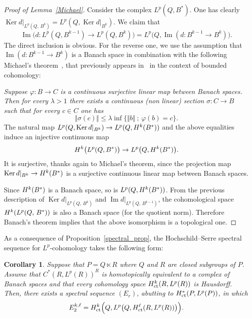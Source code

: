 \documentclass[11pt]{article}
\newtheorem{coro}[theo]{Corollary}
\theoremstyle{definition}
\numberwithin{equation}{section}
\numberwithin{figure}{section}
\numberwithin{table}{section}
\DeclareMathOperator{\Ker}{Ker}
\DeclareMathOperator{\im}{Im}
\DeclareMathOperator{\ct}{ct}
\begin{document}
\begin{proof}[Proof of Lemma~\ref{Michael}]
Consider the complex $L^p(Q,B^*)$.
One has clearly\linebreak $\Ker d \vert_{L^p (Q,\,B^k)} = L^p (Q, \Ker d \vert _{B^k})$. We claim that
\[
\im \bigl(d: L^p \left(Q, B^{k-1}\right) \to L^p\left(Q, B^k\right)\bigr) = L^p \bigl(Q, \im \left(d: B^{k-1} \to B^k\right)\bigr).
\]
The direct inclusion is obvious. For the reverse one, we use the assumption that $\im (d: B^{k-1} \to B^k)$ is a Banach space in combination with the following Michael's theorem~\cite[Proposition~7.2]{Mi}, that previously appears in~\cite[p.~93]{Monod_LNM} in the context of bounded cohomology:

\emph{Suppose $\varphi: B \to C$ is a continuous surjective linear map between Banach spaces. Then for every $\lambda >1$ there exists a continuous (non linear) section $\sigma: C \to B$ such that for every $c \in C$ one has
\[
\Vert \sigma (c) \Vert \leqslant \lambda \inf \{\Vert b \Vert~;~\varphi (b) = c\}.
\]
}
The natural map $L^p (Q, \Ker d \vert _{B^k}) \to L^p (Q, {\rm H}^k (B^*))$ and the above equalities induce an injective continuous map
\[
{\rm H}^k \bigl(L^p(Q, B^*)\bigr) \to L^p \bigl(Q, {\rm H}^k (B^*)\bigr).
\]
It is surjective, thanks again to Michael's theorem, since the projection map\linebreak$\Ker d \vert _{B^k}\to {\rm H}^k (B^*)$ is a surjective continuous linear map between Banach spaces.


Since ${\rm H}^k (B^*)$ is a Banach space, so is $L^p (Q, {\rm H}^k (B^*))$. From the previous description of $\Ker d \vert_{ L^p (Q,\,B^k)}$ and $\im d \vert _{ L^p (Q,\, B^{k-1})}$, the cohomological space ${\rm H}^k (L^p(Q,\,B^*))$ is also a Banach space (for the quotient norm). Therefore Banach's theorem implies that the above isomorphism is a topological one.
\end{proof}

As a consequence of Proposition~\ref{spectral_prop}, the Hochschild--Serre spectral sequence for $L^p$-cohomology takes the following form:

\begin{coro}\label{spectral_cor1}
Suppose that $P = Q \ltimes R$ where $Q$ and $R$ are closed subgroups of $P$. Assume that $C^*(R, L^p(R))^R$ is homotopically equivalent to a complex of Banach spaces and that every cohomology space ${\rm H}_{\ct}^k (R, L^p(R))$ is Hausdorff. Then, there exists a spectral sequence $(E_r)$, abutting to ${\rm H}_{\ct} ^*(P, L^p(P))$, in which
\[
E_2 ^{k,\ell} = {\rm H}_{\ct} ^k\Bigl(Q, L^p\bigl(Q, {\rm H}_{\ct} ^\ell (R, L^p(R))\bigr)\Bigr).
\]
\end{coro}
\end{document}
